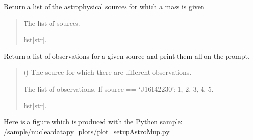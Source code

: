 \documentclass[letterpaper,10pt,english]{sphinxmanual}
\begin{document}
\begin{fulllineitems}
\label{\detokenize{source/api/setup_astro_mup:nucleardatapy.setup_astro_mup.astro_mup}}
\pysigstartsignatures
\pysiglinewithargsret
{}
{}
{}
\pysigstopsignatures
\sphinxAtStartPar
Return a list of the astrophysical sources for which a mass is given
\begin{quote}\begin{description}
\sphinxAtStartPar
The list of sources.

\sphinxAtStartPar
list{[}str{]}.

\end{description}\end{quote}

\end{fulllineitems}


\begin{fulllineitems}
\label{\detokenize{source/api/setup_astro_mup:nucleardatapy.setup_astro_mup.astro_mup_source}}
\pysigstartsignatures
\pysiglinewithargsret
{}
{}
{}
\pysigstopsignatures
\sphinxAtStartPar
Return a list of observations for a given source and print them all on the prompt.
\begin{quote}\begin{description}
\sphinxAtStartPar
{} () \textendash{} The source for which there are different observations.

\sphinxAtStartPar
The list of observations.     If source == ‘J1614\textendash{}2230’: 1, 2, 3, 4, 5.

\sphinxAtStartPar
list{[}str{]}.

\end{description}\end{quote}

\end{fulllineitems}


\sphinxAtStartPar
Here is a figure which is produced with the Python sample: /sample/nucleardatapy\_plots/plot\_setupAstroMup.py
\end{document}
